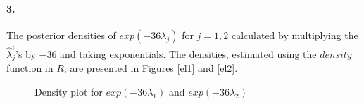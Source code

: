 \documentclass[12pt, leqno]{article}
\begin{document}
\paragraph{3.}

The posterior densities of $exp(-36 \lambda_j)$ for $j=1,2$ calculated by
multiplying the $\hat{\lambda}_j^i$'s by $-36$ and taking exponentials. The
densities, estimated using the $density$ function in
$R$, are presented
in Figures \ref{el1} and \ref{el2}. 

\begin{figure}
\centering
{}
\centering
\qquad
\centering
{}
\caption{Density plot for $exp(-36 \lambda_1)$ and $exp(-36 \lambda_2)$}
\end{figure}
\end{document}
